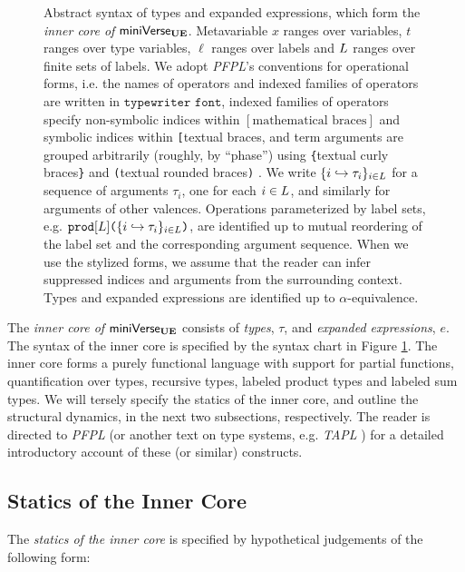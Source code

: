 \begin{figure}
\caption[Syntax of types and expanded expressions in $\miniVerseUE$]{Abstract syntax of types and expanded expressions, which form the \emph{inner core of }$\miniVerseUE$. Metavariable $x$ ranges over variables, $t$ ranges over type variables, $\ell$ ranges over labels and $L$ ranges over finite sets of labels. We adopt \emph{PFPL}'s conventions for operational forms, i.e. the names of operators and indexed families of operators are written in $\texttt{typewriter font}$, indexed families of operators specify non-symbolic indices within $[\text{mathematical braces}]$ and symbolic indices within \texttt{[}textual braces\text{]}, and term arguments are grouped arbitrarily (roughly, by ``phase'') using \texttt{\{}textual curly braces\texttt{\}} and \texttt{(}textual rounded braces\texttt{)} \cite{pfpl}. We write $\{i \hookrightarrow \tau_{i}\}_{i \in L}$ for a sequence of arguments $\tau_i$, one for each $i\in L$, and similarly for arguments of other valences. Operations  parameterized by label sets, e.g. $\texttt{prod}[L]\texttt{(}\{i \hookrightarrow \tau_{i}\}_{i \in L}\texttt{)}$, are identified up to mutual reordering of the label set and the corresponding argument sequence. %
When we use the stylized forms, we assume that the reader can infer suppressed indices and arguments from the surrounding context. Types and expanded expressions are identified up to $\alpha$-equivalence.}
\label{fig:U-expanded-terms}
\end{figure}

The \emph{inner core of} $\miniVerseUE$ consists of \emph{types}, $\tau$, and \emph{expanded expressions}, $e$. The syntax of the inner core is specified by the syntax chart in Figure \ref{fig:U-expanded-terms}. 
The {inner core} forms a purely functional language with support for partial functions, quantification over types, recursive types, labeled product types and labeled sum types. We will tersely specify the statics of the inner core, and outline the structural dynamics, in the next two subsections, respectively. The reader is directed to \emph{PFPL} \cite{pfpl} (or another text on type systems, e.g. \emph{TAPL} \cite{tapl}) for a detailed introductory account of these (or similar) constructs.

\subsection{Statics of the Inner Core}
The \emph{statics of the inner core} is specified by hypothetical judgements of the following form:

